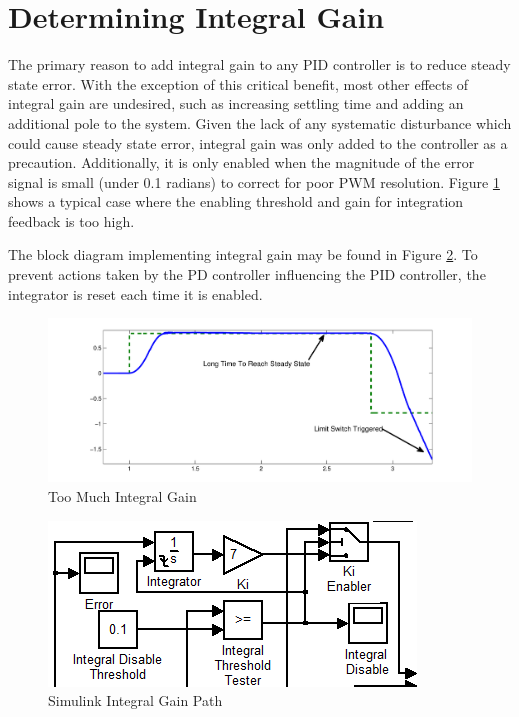 \section{Determining Integral Gain}

The primary reason to add integral gain to any PID controller is to reduce steady state error. 
With the exception of this critical benefit, most other effects of integral gain are undesired, such as increasing settling time and adding an additional pole to the system.
Given the lack of any systematic disturbance which could cause steady state error, 
integral gain was only added to the controller as a precaution.
Additionally, it is only enabled when the magnitude of the error signal is small (under 0.1 radians) to correct for poor PWM resolution.
Figure \ref{fig:ki} shows a typical case where the enabling threshold and gain for integration feedback is too high.

The block diagram implementing integral gain may be found in Figure \ref{fig:simulinkki}.
To prevent actions taken by the PD controller influencing the PID controller, the integrator is reset each time it is enabled. 



\begin{figure}[htp]
    \centering
    \includegraphics[width=.8\textwidth]{images/TooMuchKi.pdf}
    \caption{Too Much Integral Gain}
    \label{fig:ki}
\end{figure}

\begin{figure}[htp]
    \centering
    \includegraphics[scale=0.75]{images/Ki.PNG}
    \caption{Simulink Integral Gain Path}
    \label{fig:simulinkki}
\end{figure}

